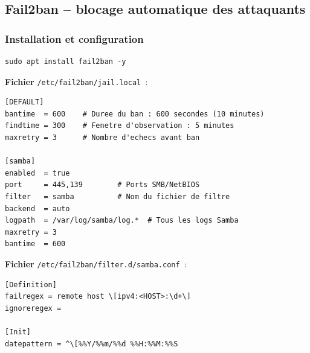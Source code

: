 \documentclass[12pt,a4paper]{article}
\begin{document}
\subsection{Fail2ban -- blocage automatique des attaquants}

\subsubsection{Installation et configuration}

\begin{lstlisting}[style=terminal]
sudo apt install fail2ban -y
\end{lstlisting}

\textbf{Fichier} \texttt{/etc/fail2ban/jail.local}~:

\begin{lstlisting}[style=config, caption={/etc/fail2ban/jail.local}]
[DEFAULT]
bantime  = 600    # Duree du ban : 600 secondes (10 minutes)
findtime = 300    # Fenetre d'observation : 5 minutes
maxretry = 3      # Nombre d'echecs avant ban

[samba]
enabled  = true
port     = 445,139        # Ports SMB/NetBIOS
filter   = samba          # Nom du fichier de filtre
backend  = auto
logpath  = /var/log/samba/log.*  # Tous les logs Samba
maxretry = 3
bantime  = 600
\end{lstlisting}

\textbf{Fichier} \texttt{/etc/fail2ban/filter.d/samba.conf}~:

\begin{lstlisting}[style=config, caption={/etc/fail2ban/filter.d/samba.conf}]
[Definition]
failregex = remote host \[ipv4:<HOST>:\d+\]
ignoreregex =

[Init]
datepattern = ^\[%%Y/%%m/%%d %%H:%%M:%%S
\end{lstlisting}
\end{document}
